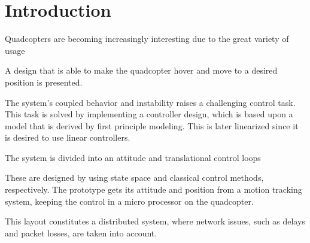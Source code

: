 \chapter{Introduction}
Quadcopters are becoming increasingly interesting due to the great variety of usage

A design that is able to make the quadcopter hover and move to a desired position is presented.

The system's coupled behavior and instability raises a challenging control task. This task is solved by implementing a controller design, which is based upon a model that is derived by first principle modeling.
This is later linearized since it is desired to use linear controllers.

The system is divided into an attitude and translational control loops

These are designed by using state space and classical control methods, respectively. The prototype gets its attitude and position from a motion tracking system, keeping the control in a micro processor on the quadcopter.

This layout constitutes a distributed system, where network issues, such as delays and packet losses, are taken into account.